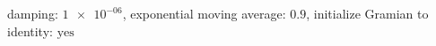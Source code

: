 damping: $\num[scientific-notation=true]{1e-06}$, exponential moving average: $\num[scientific-notation=true]{0.9}$, initialize Gramian to identity: $\text{yes}$